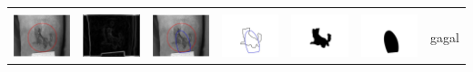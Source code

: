 \begin{table}[H]
\begin{tabular}{|m{0.7in}|m{0.7in}|m{0.7in}|m{0.7in}|m{0.7in}|m{0.7in}|m{0.7in}|}
		&  &  & & & &  \\
		\includegraphics[width=0.7in]{dataset/dataset_3/luka_merah/ready/38_interp_init.jpg}&
		\includegraphics[width=0.7in]{dataset/dataset_3/luka_merah/ready/38_interp_ext.jpg}&
		\includegraphics[width=0.7in]{dataset/dataset_3/luka_merah/ready/38_interp_result.jpg}&
		\includegraphics[width=0.7in]{dataset/dataset_3/luka_merah/ready/38_gt_r.jpg}&
		\includegraphics[width=0.7in]{dataset/dataset_3/luka_merah/ready/38_r.jpg}&
		\includegraphics[width=0.7in]{dataset/dataset_3/luka_merah/ready/38_interp_r.jpg}&
		gagal\\
		\hline
		
	\end{tabular}
\end{table}

